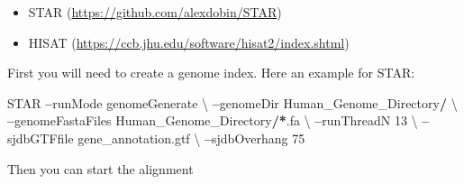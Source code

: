 \documentclass[]{book}
\newenvironment{Shaded}{\begin{snugshade}}{\end{snugshade}}
\newcommand{\DecValTok}[1]{\textcolor[rgb]{0.00,0.00,0.81}{#1}}
\newcommand{\ErrorTok}[1]{\textcolor[rgb]{0.64,0.00,0.00}{\textbf{#1}}}
\newcommand{\NormalTok}[1]{#1}
\newcommand{\OperatorTok}[1]{\textcolor[rgb]{0.81,0.36,0.00}{\textbf{#1}}}
\newcommand{\StringTok}[1]{\textcolor[rgb]{0.31,0.60,0.02}{#1}}
\begin{document}
\begin{itemize}
\item
  STAR (\url{https://github.com/alexdobin/STAR})
\item
  HISAT (\url{https://ccb.jhu.edu/software/hisat2/index.shtml})
\end{itemize}

First you will need to create a genome index.
Here an example for STAR:

\begin{Shaded}
\begin{Highlighting}[]
\NormalTok{STAR }\OperatorTok{--}\NormalTok{runMode genomeGenerate \textbackslash{}}
\OperatorTok{--}\NormalTok{genomeDir Human_Genome_Directory}\OperatorTok{/}\StringTok{ }\NormalTok{\textbackslash{}}
\OperatorTok{--}\NormalTok{genomeFastaFiles Human_Genome_Directory}\OperatorTok{/}\ErrorTok{*}\NormalTok{.fa \textbackslash{}}
\OperatorTok{--}\NormalTok{runThreadN }\DecValTok{13}\NormalTok{ \textbackslash{}}
\OperatorTok{--}\NormalTok{sjdbGTFfile gene_annotation.gtf \textbackslash{}}
\OperatorTok{--}\NormalTok{sjdbOverhang }\DecValTok{75}
\end{Highlighting}
\end{Shaded}

Then you can start the alignment
\end{document}
